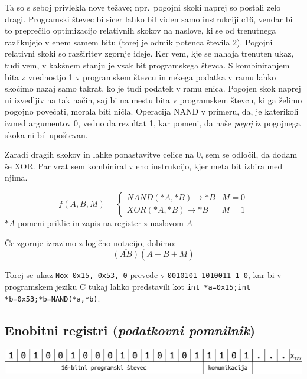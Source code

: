 \documentclass[12pt]{article}
\begin{document}
Ta so s seboj privlekla nove težave; npr.\ pogojni skoki naprej so postali zelo dragi.
Programski števec bi sicer lahko bil viden samo instrukciji c16, vendar bi to preprečilo optimizacijo relativnih skokov na naslove, ki se od trenutnega razlikujejo v enem samem bitu (torej je odmik potenca števila 2).
Pogojni relativni skoki so razširitev zgornje ideje.
Ker vem, kje se nahaja trenuten ukaz, tudi vem, v kakšnem stanju je vsak bit programskega števca.
S kombiniranjem bita z vrednostjo 1 v programskem števcu in nekega podatka v ramu lahko skočimo nazaj samo takrat, ko je tudi podatek v ramu enica.
Pogojen skok naprej ni izvedljiv na tak način, saj bi na mestu bita v programskem števcu, ki ga želimo pogojno povečati, morala biti ničla.
Operacija NAND v primeru, da, je katerikoli izmed argumentov 0, vedno da rezultat 1, kar pomeni, da naše \textit{pogoj} iz pogojnega skoka ni bil upoštevan.

Zaradi dragih skokov in lahke ponastavitve celice na 0, sem se odločil, da dodam še XOR.\@
Par vrat sem kombiniral v eno instrukcijo, kjer meta bit izbira med njima.

\begin{displaymath}
  f(A,B,M) =
  \begin{cases}
    NAND(*A, *B) \rightarrow *B & M=0\\
    XOR(*A, *B) \rightarrow *B & M=1
  \end{cases}
\end{displaymath}
$*A$ pomeni priklic in zapis na register z naslovom $A$

Če zgornje izrazimo z logično notacijo, dobimo:
\begin{displaymath}
  \overline{(AB)}(A+B+\overline{M})
\end{displaymath}

Torej se ukaz \verb|Nox 0x15, 0x53, 0| prevede v \verb|0010101 1010011 1 0|, kar bi v programskem jeziku C tukaj lahko predstavili kot \verb|int *a=0x15;int *b=0x53;*b=NAND(*a,*b)|.

\pagebreak
\subsection{Enobitni registri (\textit{podatkovni pomnilnik})}

\begin{center}
  \includegraphics[width=\linewidth]{slike/predstavitev/reg.png}
\end{center}
\end{document}
